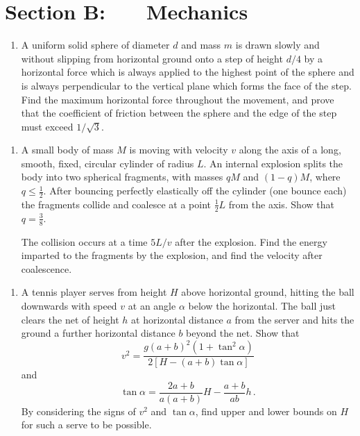 \documentclass[a4, 11pt]{report}
\newlength{\qspace}
\newcounter{qnumber}
\newenvironment{question}%
 {\vspace{\qspace}
  \begin{enumerate}[\bfseries 1\quad][10]%
    \setcounter{enumi}{\value{qnumber}}%
    \item%
 }
{
  \end{enumerate}
  \filbreak
  \stepcounter{qnumber}
 }
\def\le{\leqslant}
\begin{document}
		
	
\newpage
\section*{Section B: \ \ \ Mechanics}


	
\begin{question}
A uniform solid sphere of diameter $d$ and mass $m$ is drawn
slowly and without slipping from horizontal ground onto a step of
height $d/4$ by a horizontal 
force which is always applied to the highest point of the sphere
and is always perpendicular to the vertical plane which forms
the face of the step. Find the maximum horizontal force throughout
the movement, and prove that the coefficient of friction
between the sphere and the edge of the step must exceed
$1/\sqrt{3}$.
	\end{question}
	
\begin{question}	

A small body of mass $M$ is moving with velocity $v$ along the axis of
a long, smooth, fixed, circular cylinder of radius $L$. An internal
explosion splits the body into two spherical fragments, with masses
$qM$ and $(1-q)M$, where $q\le\frac{1}{2}$. After bouncing perfectly
elastically
off the cylinder (one bounce each) the fragments collide and coalesce
at a point $\frac{1}{2}L$ from the axis. Show that $q=\frac{3}{ 8}$. 

The collision occurs at a time $5L/v$ after the explosion. Find the
energy imparted to the fragments by the explosion, and find the
velocity after coalescence. 
\end{question}


\begin{question}
A tennis player serves from height $H$ above horizontal  ground, hitting
the ball downwards with speed $v$ at an angle $\alpha$ below the 
horizontal. The ball just clears the net of height $h$ at horizontal
distance $a$ from the server and hits the ground a further horizontal
distance $b$ beyond the net. Show that
$$
v^2 = \frac{ g(a+b)^2(1+\tan^2\alpha)}{ 2[H-(a+b)\tan\alpha]}
$$
and
$$
\tan\alpha = \frac{2a+b }{ a(a+b)}H - \frac{a+b }{ ab}h \,.
$$
By considering the signs of $v^2$ and $\tan\alpha$, find upper
and lower bounds on $H$ for such a serve to be possible.
\end{question}
	
\end{document}
